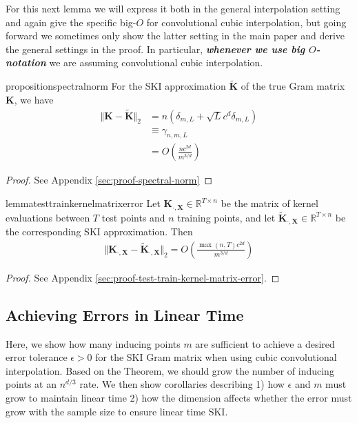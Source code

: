For this next lemma we will express it both in the general interpolation setting and again give the specific big-$O$ for convolutional cubic interpolation, but going forward we sometimes only show the latter setting in the main paper and derive the general settings in the proof. In particular, \emph{\textbf{whenever we use big $O$-notation}} we are assuming convolutional cubic interpolation.
\begin{restatable}{proposition}{spectralnorm}\label{prop:spectral-norm}
    For the SKI approximation $\tilde{\textbf{K}}$ of the true Gram matrix $\textbf{K}$, we have
    \begin{align*}
        \Vert \textbf{K}-\tilde{\textbf{K}}\Vert_2&=n \left(\delta_{m,L}+\sqrt{L} c^d\delta_{m,L}\right)\\
        &\equiv \gamma_{n,m,L}\\
        &= O\left(\frac{nc^{2d}}{m^{3/d}}\right)
    \end{align*}
\end{restatable}
\begin{proof}
    See Appendix \ref{sec:proof-spectral-norm}
\end{proof}

\begin{restatable}{lemma}{testtrainkernelmatrixerror}\label{lemma:test-train-kernel-matrix-error}
    Let \(\textbf{K}_{\cdot,\textbf{X}}\in \mathbb{R}^{T\times n}\) be the matrix of kernel evaluations between \(T\) test points and \(n\) training points, and let \(\tilde{\textbf{K}}_{\cdot,\textbf{X}}\in \mathbb{R}^{T\times n}\) be the corresponding SKI approximation. Then
    \begin{align*}
        \Vert \textbf{K}_{\cdot,\textbf{X}}-\tilde{\textbf{K}}_{\cdot,\textbf{X}}\Vert_2=O\left(\frac{\max(n,T)c^{2d}}{m^{3/d}}\right)
    \end{align*}

\end{restatable}
\begin{proof}
    See Appendix \ref{sec:proof-test-train-kernel-matrix-error}.
\end{proof}


\subsection{Achieving Errors in Linear Time}\label{subsec:linear-time}

Here, we show how many inducing points $m$ are sufficient to achieve a desired error tolerance $\epsilon > 0$ for the SKI Gram matrix when using cubic convolutional interpolation. Based on the Theorem, we should grow the number of inducing points at an $n^{d/3}$ rate. We then show corollaries describing 1) how $\epsilon$ and $m$ must grow to maintain linear time 2) how the dimension affects whether the error must grow with the sample size to ensure linear time SKI.

